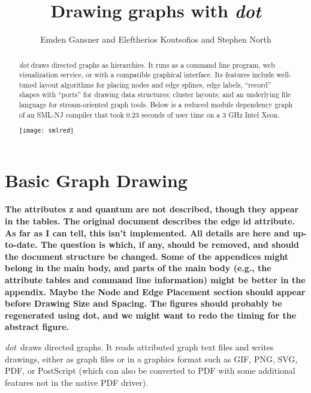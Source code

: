 \documentclass[11pt]{article}
\author{Emden Gansner and Eleftherios Koutsofios and Stephen North}
\date{\lastedited}
\def\dot{{\it dot}}
\begin{document}

\title{Drawing graphs with \dot}
\maketitle
\begin{abstract}
\noindent
{\dot} draws directed graphs as hierarchies.
It runs as a command line program, web visualization
service, or with a compatible graphical interface.
Its features include well-tuned layout algorithms
for placing nodes and edge splines, edge labels,
``record'' shapes with ``ports'' for drawing data structures;
cluster layouts; and an underlying file language for
stream-oriented graph tools.
Below is a reduced module dependency graph of an SML-NJ compiler
that took 0.23 seconds of user time on a 3 GHz Intel Xeon.

\vspace*{.25in}
\centerline{
	\texttt{[image: smlred]}
}
\end{abstract}

\newpage
\section{Basic Graph Drawing}

{\bf The attributes z and quantum are not described, though they
appear in the tables. The original document describes the edge id
attribute. As far as I can tell, this isn't implemented.
All details are here and up-to-date.
The question is which, if any, should be removed,
and should the document structure be changed. Some of the
appendices might belong in the main body, and parts of the main
body (e.g., the attribute tables and command line information) 
might be better in the appendix. Maybe the Node and Edge Placement
section should appear before Drawing Size and Spacing.
The figures should probably be regenerated using dot, and we might
want to redo the timing for the abstract figure.}
\fi

\dot\ draws directed graphs. It reads attributed graph text files and
writes drawings, either as graph files or in a graphics format
such as GIF, PNG, SVG, PDF, or PostScript (which can also be converted
to PDF with some additional features not in the native PDF driver).
\end{document}
